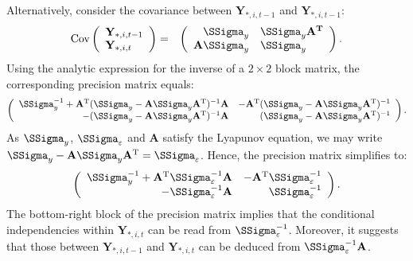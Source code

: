 \documentclass[a4paper]{article}
\theoremstyle{myexamplestyle}
\begin{document}
Alternatively, consider the covariance between $\mathbf{Y}_{\ast, i, t-1}$ and $\mathbf{Y}_{\ast, i, t-1}$:
\begin{eqnarray*}
\mbox{Cov}
\left(
\begin{array}{l}
\mathbf{Y}_{\ast, i, t-1}
\\
\mathbf{Y}_{\ast, i, t}
\end{array}
\right) & = &
\left(
\begin{array}{rl}
\SSigma_y & \SSigma_y \mathbf{A}^{\mathbf{T}}
\\
\mathbf{A} \SSigma_y & \SSigma_y
\end{array}
\right).
\end{eqnarray*}
Using the analytic expression for the inverse of a $2 \times 2$ block matrix, the corresponding precision matrix equals:
\begin{eqnarray*}
\left(
\begin{array}{rr}
\SSigma_y^{-1} + \mathbf{A}^{\mathrm{T}} (\SSigma_y - \mathbf{A} \SSigma_y \mathbf{A}^{\mathrm{T}})^{-1} \mathbf{A} & - \mathbf{A}^{\mathrm{T}} (\SSigma_y - \mathbf{A} \SSigma_y \mathbf{A}^{\mathrm{T}})^{-1}
\\
-  (\SSigma_y - \mathbf{A} \SSigma_y \mathbf{A}^{\mathrm{T}})^{-1} \mathbf{A} & (\SSigma_y - \mathbf{A} \SSigma_y \mathbf{A}^{\mathrm{T}})^{-1}
\end{array}
\right).
\end{eqnarray*}
As $\SSigma_y$, $\SSigma_{\varepsilon}$ and $\mathbf{A}$ satisfy the Lyapunov equation, we may write $\SSigma_y - \mathbf{A} \SSigma_y \mathbf{A}^{\mathrm{T}} = \SSigma_{\varepsilon}$. Hence, the precision matrix simplifies to:
\begin{eqnarray*}
\left(
\begin{array}{rr}
\SSigma_y^{-1} + \mathbf{A}^{\mathrm{T}} \SSigma_{\varepsilon}^{-1} \mathbf{A} & - \mathbf{A}^{\mathrm{T}} \SSigma_{\varepsilon}^{-1}
\\
-  \SSigma_{\varepsilon}^{-1} \mathbf{A} & \SSigma_{\varepsilon}^{-1}
\end{array}
\right).
\end{eqnarray*}
The bottom-right block of the precision matrix implies that the conditional independencies within $\mathbf{Y}_{\ast, i, t}$ can be read from $\SSigma_{\varepsilon}^{-1}$. Moreover, it suggests that those between $\mathbf{Y}_{\ast, i, t-1}$ and $\mathbf{Y}_{\ast, i, t}$ can be deduced from $\SSigma_{\varepsilon}^{-1} \mathbf{A}$.
\end{document}
